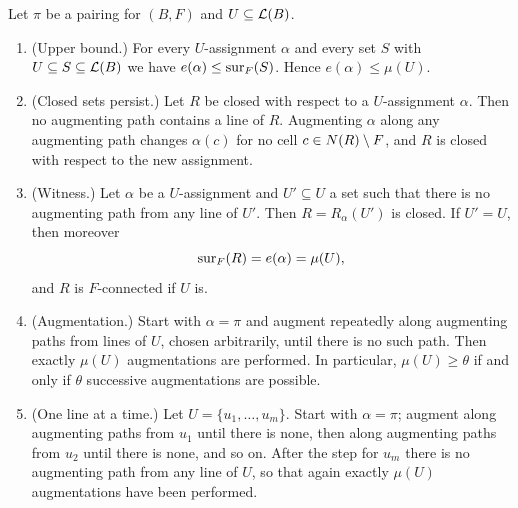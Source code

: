 \begin{proposition}\label{prop:maxflow}
Let $\pi$ be a pairing for $(B,F)$ and $U\subseteq\mathcal{L}(B)$.
\begin{enumerate}[label=\textup{(\alph*)}]
\item \textup{(Upper bound.)} For every $U$-assignment $\alpha$ and every set $S$ with
      $U\subseteq S\subseteq\mathcal{L}(B)$ we have $e(\alpha)\le\operatorname{sur}_F(S)$. Hence $e(\alpha)\le\mu(U)$.
\item \textup{(Closed sets persist.)} Let $R$ be closed with respect to a $U$-assignment $\alpha$. Then no
      augmenting path contains a line of $R$. Augmenting $\alpha$ along any augmenting path changes
      $\alpha(c)$ for no cell $c\in N(R)\setminus F$, and $R$ is closed with respect to the new assignment.
\item \textup{(Witness.)} Let $\alpha$ be a $U$-assignment and $U'\subseteq U$ a set such that there is no
      augmenting path from any line of $U'$. Then $R=R_\alpha(U')$ is closed. If $U'=U$, then moreover
      \[
        \operatorname{sur}_F(R)=e(\alpha)=\mu(U),
      \]
      and $R$ is $F$-connected if $U$ is.
\item \textup{(Augmentation.)} Start with $\alpha=\pi$ and augment repeatedly along augmenting paths from
      lines of $U$, chosen arbitrarily, until there is no such path. Then exactly $\mu(U)$ augmentations
      are performed. In particular, $\mu(U)\ge\theta$ if and only if $\theta$ successive augmentations
      are possible.
\item \textup{(One line at a time.)} Let $U=\{u_1,\dots,u_m\}$. Start with $\alpha=\pi$; augment along
      augmenting paths from $u_1$ until there is none, then along augmenting paths from $u_2$ until there
      is none, and so on. After the step for $u_m$ there is no augmenting path from any line of $U$, so
      that again exactly $\mu(U)$ augmentations have been performed.
\end{enumerate}
\end{proposition}

